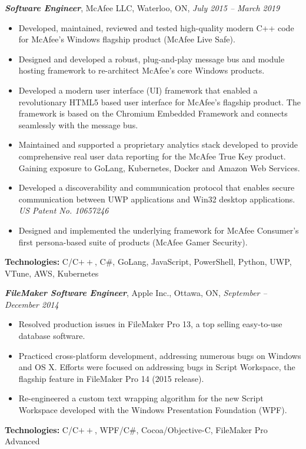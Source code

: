 \documentclass[10pt,letterpaper]{article}
\newcommand{\job}[4]
{
    \emph{\textbf{#1}}, #2, #3, \emph{#4}
}
\begin{document}
\job{Software Engineer}{McAfee LLC}{Waterloo, ON}{July 2015 -- March 2019}\\
\begin{adjustwidth}{0.1in}{0.5in}
    \begin{itemize}
    \item Developed, maintained, reviewed and tested high-quality modern C++ code for McAfee's Windows flagship product (McAfee Live Safe).
    \item Designed and developed a robust, plug-and-play message bus and module hosting framework to re-architect McAfee's core Windows products.
    \item Developed a modern user interface (UI) framework that enabled a revolutionary HTML5 based user interface for McAfee's flagship product. The framework is based on the Chromium Embedded Framework and connects seamlessly with the message bus.
    \item Maintained and supported a proprietary analytics stack developed to provide comprehensive real user data reporting for the McAfee True Key product. Gaining exposure to GoLang, Kubernetes, Docker and Amazon Web Services.
    \item Developed a discoverability and communication protocol that enables secure communication between UWP applications and Win32 desktop applications. \emph{US Patent No. 10657246}
    \item Designed and implemented the underlying framework for McAfee Consumer’s first persona-based suite of products (McAfee Gamer Security). 
    \end{itemize}
    \vspace{0.5em}
    \textbf{Technologies:} C/C$++$, C\#, GoLang, JavaScript, PowerShell, Python, UWP, VTune, AWS, Kubernetes
\end{adjustwidth}
\vspace{0.8em}
\job{FileMaker Software Engineer}{Apple Inc.}{Ottawa, ON}{September -- December  2014}\\
\begin{adjustwidth}{0.1in}{0.5in}
    \begin{itemize}
    \item Resolved production issues in FileMaker Pro 13, a top selling easy-to-use database software.
    \item Practiced cross-platform development, addressing numerous bugs on Windows and OS X. Efforts were focused on addressing bugs in Script Workspace, the flagship feature in FileMaker Pro 14 (2015 release).
    \item Re-engineered a custom text wrapping algorithm for the new Script Workspace developed with the Windows Presentation Foundation (WPF).
    \end{itemize}
    \vspace{0.5em}
    \textbf{Technologies:} C/C$++$, WPF/C\#, Cocoa/Objective-C, FileMaker Pro Advanced
\end{adjustwidth}
\end{document}
